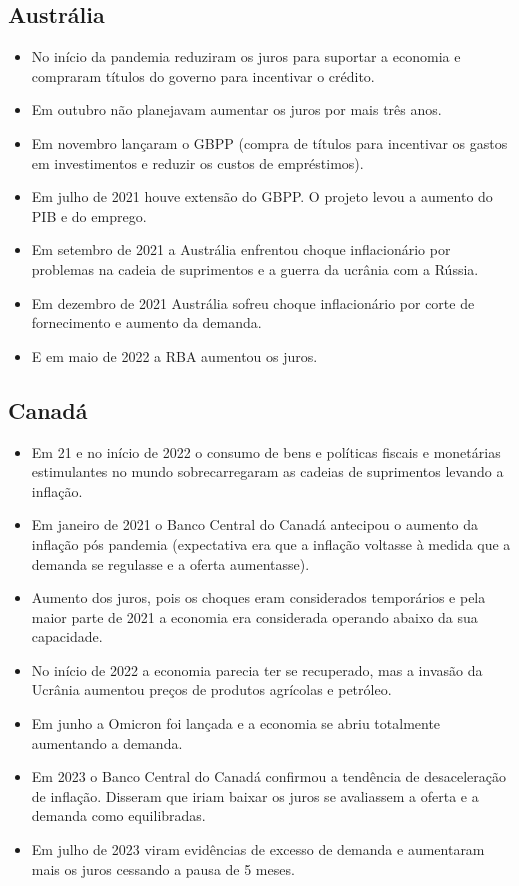 \documentclass[a4paper,12pt]{article}[abntex2]
\begin{document}
\subsection{\textbf{Austrália}}
\begin{itemize}
\item No início da pandemia reduziram os juros para suportar a economia e compraram títulos do governo para incentivar o crédito.
\item Em outubro não planejavam aumentar os juros por mais três anos.
\item Em novembro lançaram o GBPP (compra de títulos para incentivar os gastos em investimentos e reduzir os custos de empréstimos).
\item Em julho de 2021 houve extensão do GBPP. O projeto levou a aumento do PIB e do emprego. 
\item Em setembro de 2021 a Austrália enfrentou choque inflacionário por problemas na cadeia de suprimentos e a guerra da ucrânia com a Rússia.
\item Em dezembro de 2021 Austrália sofreu choque inflacionário por corte de fornecimento e aumento da demanda.
\item E em maio de 2022 a RBA aumentou os juros.
\end{itemize}

\subsection{\textbf{Canadá}}
\begin{itemize}
\item Em 21 e no início de 2022 o consumo de bens e políticas fiscais e monetárias estimulantes no mundo sobrecarregaram as cadeias de suprimentos levando a inflação.
\item Em janeiro de 2021 o Banco Central do Canadá antecipou o aumento da inflação pós pandemia (expectativa era que a inflação voltasse à medida que a demanda se regulasse e a oferta aumentasse).
\item Aumento dos juros, pois os choques eram considerados temporários e pela maior parte de 2021 a economia era considerada operando abaixo da sua capacidade.
\item No início de 2022 a economia parecia ter se recuperado, mas a invasão da Ucrânia aumentou preços de produtos agrícolas e petróleo.
\item Em junho a Omicron foi lançada e a economia se abriu totalmente aumentando a demanda.
\item Em 2023 o Banco Central do Canadá confirmou a tendência de desaceleração de inflação. Disseram que iriam baixar os juros se avaliassem a oferta e a demanda como equilibradas.
\item Em julho de 2023 viram evidências de excesso de demanda e aumentaram mais os juros cessando a pausa de 5 meses. 
\end{itemize}
\end{document}
